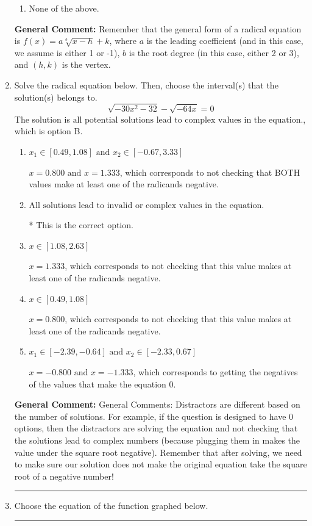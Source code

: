 \documentclass{extbook}[14pt]
\newcommand{\litem}[1]{\item #1

\rule{\textwidth}{0.4pt}}
\begin{document}
\begin{enumerate}
{\begin{enumerate}[label=\Alph*.]
\begin{multicols}{2}
\end{multicols}\item None of the above.\end{enumerate}
\textbf{General Comment:} Remember that the general form of a radical equation is $ f(x) = a \sqrt[b]{x - h} + k $, where $a$ is the leading coefficient (and in this case, we assume is either 1 or -1), $b$ is the root degree (in this case, either 2 or 3), and $(h, k)$ is the vertex.
}
\litem{
Solve the radical equation below. Then, choose the interval(s) that the solution(s) belongs to.
\[ \sqrt{-30 x^2 - 32} - \sqrt{-64 x} = 0 \]The solution is \( \text{all potential solutions lead to complex values in the equation.} \), which is option B.\begin{enumerate}[label=\Alph*.]
\item \( x_1 \in [0.49, 1.08] \text{ and } x_2 \in [-0.67,3.33] \)

$x = 0.800 \text{ and } x = 1.333$, which corresponds to not checking that BOTH values make at least one of the radicands negative.
\item \( \text{All solutions lead to invalid or complex values in the equation.} \)

* This is the correct option.
\item \( x \in [1.08,2.63] \)

$x = 1.333$, which corresponds to not checking that this value makes at least one of the radicands negative.
\item \( x \in [0.49,1.08] \)

$x = 0.800$, which corresponds to not checking that this value makes at least one of the radicands negative.
\item \( x_1 \in [-2.39, -0.64] \text{ and } x_2 \in [-2.33,0.67] \)

$x = -0.800 \text{ and } x = -1.333$, which corresponds to getting the negatives of the values that make the equation 0.
\end{enumerate}

\textbf{General Comment:} General Comments: Distractors are different based on the number of solutions. For example, if the question is designed to have 0 options, then the distractors are solving the equation and not checking that the solutions lead to complex numbers (because plugging them in makes the value under the square root negative). Remember that after solving, we need to make sure our solution does not make the original equation take the square root of a negative number!
}
\litem{
Choose the equation of the function graphed below.

}
\end{enumerate}
\end{document}
